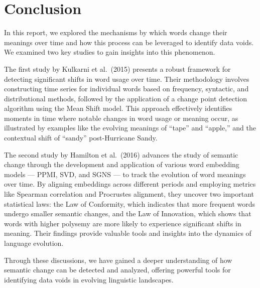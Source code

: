 
\section{Conclusion}\label{sec:}
In this report, we explored the mechanisms by which words change their meanings over time and how this process can be leveraged to identify data voids.
We examined two key studies to gain insights into this phenomenon.

The first study by Kulkarni et al.\ (2015) presents a robust framework for detecting significant shifts in word usage over time.
Their methodology involves constructing time series for individual words based on frequency, syntactic, and distributional methods, followed by the application of a change point detection algorithm using the Mean Shift model.
This approach effectively identifies moments in time where notable changes in word usage or meaning occur, as illustrated by examples like the evolving meanings of “tape” and “apple,” and the contextual shift of “sandy” post-Hurricane Sandy.

The second study by Hamilton et al.\ (2016) advances the study of semantic change through the development and application of various word embedding models — PPMI, SVD, and SGNS — to track the evolution of word meanings over time.
By aligning embeddings across different periods and employing metrics like Spearman correlation and Procrustes alignment,
they uncover two important statistical laws: the Law of Conformity, which indicates that more frequent words undergo smaller semantic changes,
and the Law of Innovation, which shows that words with higher polysemy are more likely to experience significant shifts in meaning.
Their findings provide valuable tools and insights into the dynamics of language evolution.

Through these discussions, we have gained a deeper understanding of how semantic change can be detected and analyzed,
offering powerful tools for identifying data voids in evolving linguistic landscapes.